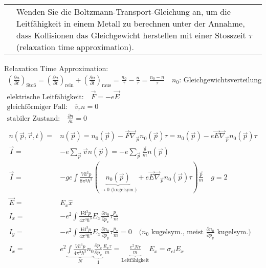 \documentclass[a4paper,12pt]{scrartcl}
\makeatletter
\def\pf#1#2{\frac{\partial #1}{\partial #2}}		%
\def\ka#1{\left(#1\right)}				%
\def\ddd{\mathrm{d}^3}					%
\newcounter{qc}\setcounter{qc}{1}
\newenvironment{fshaded}{
\def\FrameCommand{\fcolorbox{framecolor}{shadecolor}}
\MakeFramed {\FrameRestore}}
{\endMakeFramed}
\def\frage#1{
\begin{fshaded}
\noindent
\begin{tabularx}{0.99\textwidth}{@{}c!{\color{framecolor}\vline}X}
{ \bf \rm \theqc }	&	\noindent #1
\end{tabularx}
\stepcounter{qc}
\end{fshaded}
}
\makeatother
\begin{document}
\frage{Wenden Sie die Boltzmann-Transport-Gleichung an, um die Leitfähigkeit in einem Metall zu berechnen unter der Annahme, 
dass Kollisionen das Gleichgewicht herstellen mit einer Stosszeit $\tau$ (relaxation time
approximation).}
\noindent
Relaxation Time Approximation:
\begin{align*}
	\ka{\pf nt}_{\text{Stoß}}=\ka{\pf nt}_{\text{rein}} +\ka{\pf nt}_{\text{raus}}=\frac {n_0}\tau-\frac {n}\tau=\frac 
{n_0-n}\tau\quad\text{$n_0$: Gleichgewichtsverteilung}\\
	\text{elektrische Leitfähigkeit:}\quad\vec F=-e\vec E\\
	\text{gleichförmiger Fall:}\quad\overline v_rn=0\\
	\text{stabiler Zustand:}\quad\pf nt=0\\
\end{align*}	
\begin{align*}	
	n(\vec p,\vec r,t)=&n(\vec p)=n_0(\vec p)-\vec F\vec\nabla_{\vec p}n_0(\vec p)\tau=n_0(\vec p)-e\vec E\vec\nabla_{\vec 
p}n_0(\vec p)\tau\\
	\vec I=&-e\sum_{\vec p}\vec vn(\vec p)=-e\sum_{\vec p}\frac{\vec p}mn(\vec p)\\
	\vec I=&-ge\int\frac{V\ddd p}{8\pi^3\hbar^3}(\underbrace{n_0(\vec p)}_{\rightarrow0\text{ (kugelsym.)}}+e\vec 
E\vec\nabla_{\vec p}n_0(\vec p)\tau)\frac{\vec p}m\quad g=2\\
	\vec E=&E_x\hat x\\
	I_x=&-e^2\int\frac{V\ddd p}{4\pi^3\hbar^3}E_x\pf {n_0}{p_x}\tau\frac{p_x}m\\
	I_y=&-e^2\int\frac{V\ddd p}{4\pi^3\hbar^3}E_x\pf {n_0}{p_y}\tau\frac{p_x}m=0\quad\text{($n_0$ kugelsym., meist $\pf 
{n_0}{p_y}$ kugelsym.)}\\
	I_x=&e^2\underbrace{\int\frac{V\ddd p}{4\pi^3\hbar^3}n_0}_N\underbrace{\pf 
{p_x}{p_x}}_1\frac{E_x\tau}m=\underbrace{\frac{e^2N\tau}m}_{\text{Leitfähigkeit}}E_x=\sigma_{el}E_x\\
\end{align*}

\end{document}

